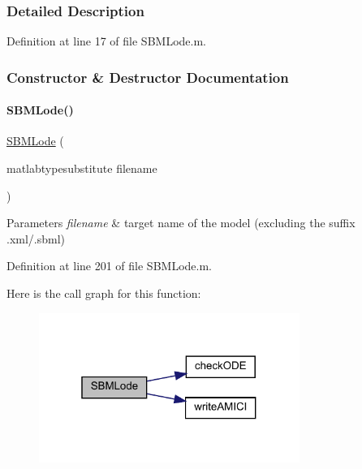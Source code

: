 \subsubsection{Detailed Description}


Definition at line 17 of file S\+B\+M\+Lode.\+m.



\subsubsection{Constructor \& Destructor Documentation}
\mbox{\label{class_s_b_m_lode_a2cd0d930d07eaf96753131799d7bdc9c}} 
\paragraph{\texorpdfstring{S\+B\+M\+Lode()}{SBMLode()}}
{\footnotesize\ttfamily \hyperlink{class_s_b_m_lode}{S\+B\+M\+Lode} (\begin{DoxyParamCaption}\item[{matlabtypesubstitute}]{filename }\end{DoxyParamCaption})}


\begin{DoxyParams}{Parameters}
{\em filename} & target name of the model (excluding the suffix .xml/.sbml) \\
\hline
\end{DoxyParams}


Definition at line 201 of file S\+B\+M\+Lode.\+m.

Here is the call graph for this function\+:\nopagebreak
\begin{figure}[H]
\begin{center}
\leavevmode
\includegraphics[width=241pt]{class_s_b_m_lode_a2cd0d930d07eaf96753131799d7bdc9c_cgraph}
\end{center}
\end{figure}


